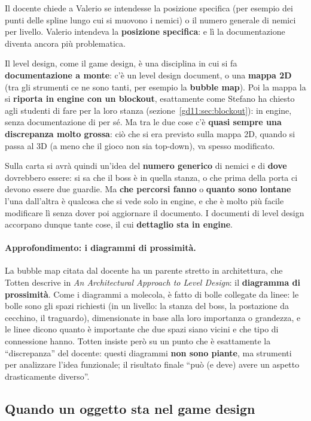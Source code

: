 Il docente chiede a Valerio se intendesse la posizione specifica (per
esempio dei punti delle spline lungo cui si muovono i nemici) o il numero
generale di nemici per livello. Valerio intendeva la \textbf{posizione
specifica}: e lì la documentazione diventa ancora più problematica.

Il level design, come il game design, è una disciplina in cui si fa
\textbf{documentazione a monte}: c'è un level design document, o una
\textbf{mappa 2D} (tra gli strumenti ce ne sono tanti, per esempio la
\textbf{bubble map}). Poi la mappa la si \textbf{riporta in engine con un
blockout}, esattamente come Stefano ha chiesto agli studenti di fare per la
loro stanza (sezione~\ref{gd11:sec:blockout}): in engine, senza
documentazione di per sé. Ma tra le due cose c'è \textbf{quasi sempre una
discrepanza molto grossa}: ciò che si era previsto sulla mappa 2D, quando si
passa al 3D (a meno che il gioco non sia top-down), va spesso modificato.

Sulla carta si avrà quindi un'idea del \textbf{numero generico} di nemici e
di \textbf{dove} dovrebbero essere: si sa che il boss è in quella stanza, o
che prima della porta ci devono essere due guardie. Ma \textbf{che percorsi
fanno} o \textbf{quanto sono lontane} l'una dall'altra è qualcosa che si
vede solo in engine, e che è molto più facile modificare lì senza dover poi
aggiornare il documento. I documenti di level design accorpano dunque tante
cose, il cui \textbf{dettaglio sta in engine}.

\paragraph{Approfondimento: i diagrammi di prossimità.} La bubble map citata
dal docente ha un parente stretto in architettura, che Totten descrive in
\emph{An Architectural Approach to Level Design}: il \textbf{diagramma di
prossimità}. Come i diagrammi a molecola, è fatto di bolle collegate da
linee: le bolle sono gli spazi richiesti (in un livello: la stanza del boss,
la postazione da cecchino, il traguardo), dimensionate in base alla loro
importanza o grandezza, e le linee dicono quanto è importante che due spazi
siano vicini e che tipo di connessione hanno. Totten insiste però su un
punto che è esattamente la ``discrepanza'' del docente: questi diagrammi
\textbf{non sono piante}, ma strumenti per analizzare l'idea funzionale; il
risultato finale ``può (e deve) avere un aspetto drasticamente diverso''.

\subsection{Quando un oggetto sta nel game design}

